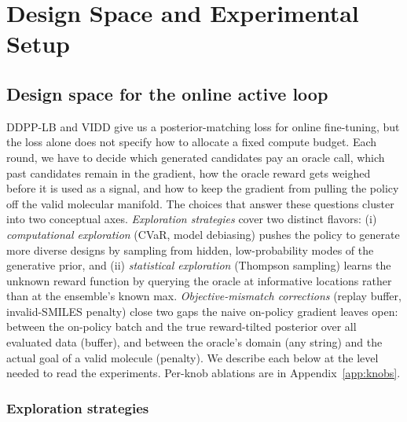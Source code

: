 \documentclass{article}
\begin{document}



\section{Design Space and Experimental Setup}\label{sec:design-and-setup}

\subsection{Design space for the online active loop}\label{sec:design-space}

DDPP-LB and VIDD give us a posterior-matching loss for online fine-tuning, but the loss alone does not specify how to allocate a fixed compute budget. Each round, we have to decide which generated candidates pay an oracle call, which past candidates remain in the gradient, how the oracle reward gets weighed before it is used as a signal, and how to keep the gradient from pulling the policy off the valid molecular manifold. The choices that answer these questions cluster into two conceptual axes. \emph{Exploration strategies} cover two distinct flavors: (i) \emph{computational exploration} (CVaR, model debiasing) pushes the policy to generate more diverse designs by sampling from hidden, low-probability modes of the generative prior, and (ii) \emph{statistical exploration} (Thompson sampling) learns the unknown reward function by querying the oracle at informative locations rather than at the ensemble's known max. \emph{Objective-mismatch corrections} (replay buffer, invalid-SMILES penalty) close two gaps the naive on-policy gradient leaves open: between the on-policy batch and the true reward-tilted posterior over all evaluated data (buffer), and between the oracle's domain (any string) and the actual goal of a valid molecule (penalty). We describe each below at the level needed to read the experiments. Per-knob ablations are in Appendix~\ref{app:knobs}.

\subsubsection{Exploration strategies}\label{sec:design-explore}
\end{document}
